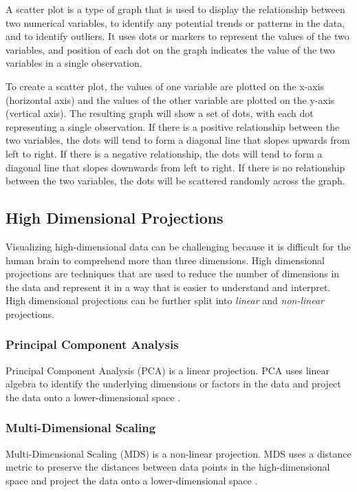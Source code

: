 A scatter plot is a type of graph that is used to display the relationship between two numerical variables, to identify any potential trends or patterns in the data, and to identify outliers. It uses dots or markers to represent the values of the two variables, and position of each dot on the graph indicates the value of the two variables in a single observation.

To create a scatter plot, the values of one variable are plotted on the x-axis (horizontal axis) and the values of the other variable are plotted on the y-axis (vertical axis). The resulting graph will show a set of dots, with each dot representing a single observation. If there is a positive relationship between the two variables, the dots will tend to form a diagonal line that slopes upwards from left to right. If there is a negative relationship, the dots will tend to form a diagonal line that slopes downwards from left to right. If there is no relationship between the two variables, the dots will be scattered randomly across the graph.


\subsection{High Dimensional Projections}

Visualizing high-dimensional data can be challenging because it is difficult for the human brain to comprehend more than three dimensions. High dimensional projections are techniques that are used to reduce the number of dimensions in the data and represent it in a way that is easier to understand and interpret. High dimensional projections can be further split into \emph{linear} and \emph{non-linear} projections.


\subsubsection{Principal Component Analysis}

Principal Component Analysis (PCA) is a linear projection. PCA uses linear algebra to identify the underlying dimensions or factors in the data and project the data onto a lower-dimensional space \parencite{abdi2010principal}.


\subsubsection{Multi-Dimensional Scaling}

Multi-Dimensional Scaling (MDS) is a non-linear projection. MDS uses a distance metric to preserve the distances between data points in the high-dimensional space and project the data onto a lower-dimensional space \parencite{morrison2003fast}.


